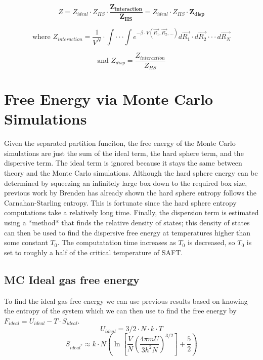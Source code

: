 \begin{equation}\label{eq:disp1}
Z=Z_{ideal}\cdot Z_{HS}\cdot \boldsymbol{\frac{Z_{interaction}}{Z_{HS}}}=Z_{ideal}\cdot Z_{HS}\cdot \boldsymbol{Z_{disp}}
\end{equation}

\begin{equation}\label{eq:disp1}
\text{where }Z_{interaction}=\frac{1}{V^N}\cdot \int\cdot\cdot\cdot\int e^{-\beta\cdot V(\vec{R_1},\vec{R_2},...)}d\vec{R_1}\cdot d\vec{R_2}\cdot\cdot\cdot d\vec{R_N}
\end{equation}

\begin{equation}\label{eq:disp1}
\text{and }Z_{disp}= \frac{Z_{interaction}}{Z_{HS}}
\end{equation}
\section{Free Energy via Monte Carlo Simulations}
Given the separated partition funciton, the free energy of the Monte Carlo simulations are just the sum of the ideal term, the hard sphere term, and the dispersive term. The ideal term is ignored because it stays the same between theory and the Monte Carlo simulations. Although the hard sphere energy can be determined by squeezing an infinitely large box down to the required box size, previous work by Brenden has already shown the hard sphere entropy follows the Carnahan-Starling entropy. This is fortunate since the hard sphere entropy computations take a relatively long time. Finally, the dispersion term is estimated using a *method* that finds the relative density of states; this density of states can then be used to find the dispersive free energy at temperatures higher than some constant $T_0$. The computatation time increases as $T_0$ is decreased, so $T_0$ is set to roughly a half of the critical temperature of SAFT.
\subsection{MC Ideal gas free energy}
To find the ideal gas free energy we can use previous results based on knowing the entropy of the system which we can then use to find the free energy by $F_{ideal}=U_{ideal}-T\cdot S_{ideal}$.
\begin{equation}\label{eq:idealInternalEnergy}
U_{ideal}=3/2\cdot N\cdot k\cdot T
\end{equation}
 \begin{equation}\label{eq:sackurTetrodeApprox} 
S_{ideal^*}\approx k\cdot N \left ( \ln\left [ \frac{V}{N}\left ( \frac{4 \pi m U}{3 h^2 N} \right)^{3/2} \right]+\frac{5}{2}\right )
\end{equation}


